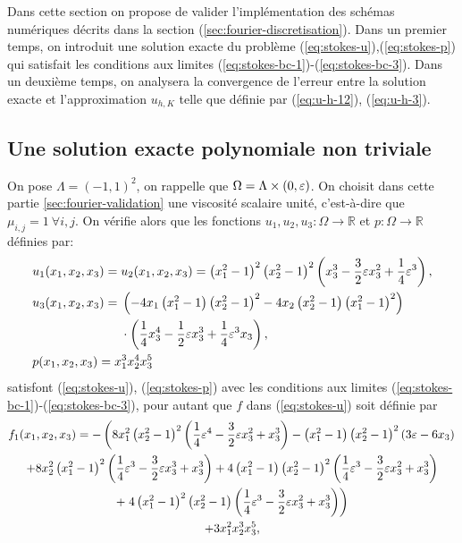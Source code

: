 Dans cette section on propose de valider l'implémentation des schémas
numériques décrits dans la section
(\ref{sec:fourier-discretisation}). Dans un premier temps, on
introduit une solution exacte du problème
(\ref{eq:stokes-u}),(\ref{eq:stokes-p}) qui satisfait les conditions
aux limites (\ref{eq:stokes-bc-1})-(\ref{eq:stokes-bc-3}). Dans un
deuxième temps, on analysera la convergence de l'erreur entre la
solution exacte et l'approximation $u_{h,K}$ telle que définie par
(\ref{eq:u-h-12}), (\ref{eq:u-h-3}).

\subsection{Une solution exacte polynomiale non triviale}
On pose $\Lambda = (-1, 1)^2$, on rappelle que $\Omega =
\Lambda\times(0,\varepsilon)$. On choisit dans cette partie
\ref{sec:fourier-validation} une viscosité scalaire unité,
c'est-à-dire que $\mu_{i,j} = 1\ \forall i,j$. On vérifie alors que les
fonctions $u_1, u_2, u_3:\Omega\to\mathbb R$ et $p:\Omega\to\mathbb R$
définies par:
\begin{align}
  &u_1(x_1, x_2, x_3) = u_2(x_1, x_2, x_3) = \parent{x_1^2 - 1}^2 %
  \parent{x_2^2 - 1}^2
  \parent{x_3^3 - \frac{3}{2}\thickness x_3^2 + \frac{1}{4}\thickness ^3},\label{eq:stokes-exact-sol-1}\\
  &u_3(x_1, x_2, x_3) = %
  \begin{aligned}[t]
    &\parent{-4x_1\parent{x_1^2 - 1} %
                                   \parent{x_2^2 - 1}^2 %
                              -4x_2\parent{x_2^2 - 1} %
                                   \parent{x_1^2 - 1}^2} \\
    &\cdot\parent{\frac{1}{4}x_3^4 - \frac{1}{2}\thickness x_3^3 + \frac{1}{4}\thickness ^3x_3},
  \end{aligned}\label{eq:stokes-exact-sol-2}\\
  &p(x_1, x_2, x_3) = x_1^3 x_2^4 x_3^5\label{eq:stokes-exact-sol-3}
\end{align}
satisfont (\ref{eq:stokes-u}), (\ref{eq:stokes-p}) avec les
conditions aux limites (\ref{eq:stokes-bc-1})-(\ref{eq:stokes-bc-3}),
pour autant que $f$ dans (\ref{eq:stokes-u}) soit définie par
\begin{multline}
  f_1(x_1, x_2, x_3) =
  -\left(
       8x_1^2
       \left( x_2^2 - 1 \right)^2
       \left( \frac{1}{4}\varepsilon ^4 - \frac{3}{2}\varepsilon x_3^2 + x_3^3 \right)
     - \left( x_1^2 - 1 \right)
       \left( x_2^2 - 1 \right)^2
       \left( 3\varepsilon  - 6x_3 \right)
   \right.\\
  + 8x_2^2
  \left( x_1^2-1 \right)^2
  \left( \frac{1}{4} \varepsilon ^3 - \frac{3}{2}\varepsilon x_3^3 + x_3^3 \right)
  + 4\left( x_1^2 - 1 \right)
     \left( x_2^2 - 1 \right)^2
     \left( \frac{1}{4}\varepsilon ^3 -\frac{3}{2} \varepsilon x_3^2 + x_3^3 \right)\\
    + \left.4\left( x_1^2 - 1 \right)^2\left( x_2^2 - 1 \right)
      \left( \frac{1}{4}\varepsilon ^3 - \frac{3}{2} \varepsilon x_3^2 + x_3^3 \right)\right)\\
    + 3x_1^2 x_2^3x_3^5,
\end{multline}
